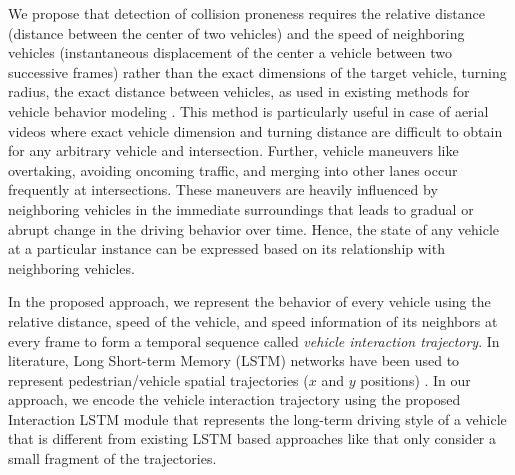 \documentclass[final,journal]{IEEEtran}
\begin{document}
We propose that detection of collision proneness requires the relative distance (distance between the center of two vehicles) and the speed of neighboring vehicles (instantaneous displacement of the center a vehicle between two successive frames) rather than the exact dimensions of the target vehicle, turning radius, the exact distance between vehicles, as used in existing methods for vehicle behavior modeling \cite{social_mixed, social2d,convolutional_social}. This method is particularly useful in case of aerial videos where exact vehicle dimension and turning distance are difficult to obtain for any arbitrary vehicle and intersection. Further, vehicle maneuvers like overtaking, avoiding oncoming traffic, and merging into other lanes occur frequently at intersections. These maneuvers are heavily influenced by neighboring vehicles in the immediate surroundings that leads to gradual or abrupt change in the driving behavior over time. Hence, the state of any vehicle at a particular instance can be expressed based on its relationship with neighboring vehicles.

In the proposed approach, we represent the behavior of every vehicle using the relative distance, speed of the vehicle, and speed information of its neighbors at every frame to form a temporal sequence called \textit{vehicle interaction trajectory}. In literature, Long Short-term Memory (LSTM) networks have been used to represent pedestrian/vehicle spatial trajectories ($x$ and $y$ positions) \cite{social_lstm, social_gan}. In our approach, we encode the vehicle interaction trajectory using the proposed Interaction LSTM module that represents the long-term driving style of a vehicle that is different from existing LSTM based approaches like \cite{social_lstm,social_gan,social_attention} that only consider a small fragment of the trajectories. 
\end{document}
